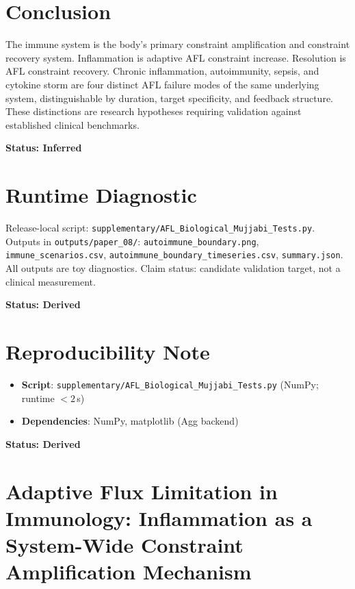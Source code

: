 \documentclass[12pt,a4paper]{article}
\begin{document}
\section{Conclusion}

The immune system is the body's primary constraint amplification and constraint recovery system. Inflammation is adaptive AFL constraint increase. Resolution is AFL constraint recovery. Chronic inflammation, autoimmunity, sepsis, and cytokine storm are four distinct AFL failure modes of the same underlying system, distinguishable by duration, target specificity, and feedback structure. These distinctions are research hypotheses requiring validation against established clinical benchmarks.

\textbf{Status: Inferred}

\section{Runtime Diagnostic}

Release-local script: \texttt{supplementary/AFL\_Biological\_Mujjabi\_Tests.py}. Outputs in \texttt{outputs/paper\_08/}: \texttt{autoimmune\_boundary.png}, \texttt{immune\_scenarios.csv}, \texttt{autoimmune\_boundary\_timeseries.csv}, \texttt{summary.json}. All outputs are toy diagnostics. Claim status: candidate validation target, not a clinical measurement.

\textbf{Status: Derived}

\section{Reproducibility Note}
\begin{itemize}
    \item \textbf{Script}: \texttt{supplementary/AFL\_Biological\_Mujjabi\_Tests.py} (NumPy; runtime $< 2$\,s)
    \item \textbf{Dependencies}: NumPy, matplotlib (Agg backend)
\end{itemize}
\textbf{Status: Derived}
\clearpage
\section*{Adaptive Flux Limitation in Immunology: Inflammation as a System-Wide Constraint Amplification Mechanism}




\end{document}
